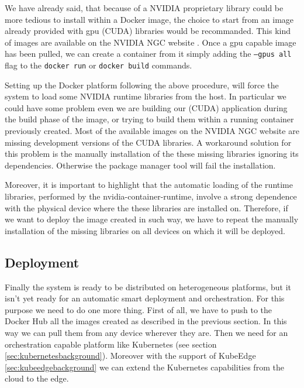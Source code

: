 We have already said, that because of a NVIDIA proprietary library could be more tedious to install within a Docker image, the choice to start from an image already provided with gpu (CUDA) libraries would be recommanded. This kind of images are available on the NVIDIA NGC website \cite{nvidiangc}. Once a gpu capable image has been pulled, we can create a container from it simply adding the \texttt{--gpus all} flag to the \texttt{docker run} or \texttt{docker build} commands.

Setting up the Docker platform following the above procedure, will force the system to load some NVIDIA runtime libraries from the host. 
In particular we could have some problem even we are building our (CUDA) application during the build phase of the image, or trying to build them within a running container previously created. 
Most of the available images on the NVIDIA NGC website are missing development versions of the CUDA libraries. A workaround solution for this problem is the manually installation of the these missing libraries ignoring its dependencies. Otherwise the package manager tool will fail the installation.

Moreover, it is important to highlight that the automatic loading of the runtime libraries, performed by the nvidia-container-runtime, involve a strong dependence with the physical device where the these libraries are installed on. Therefore, if we want to deploy the image created in such way, we have to repeat the manually installation of the missing libraries on all devices on which it will be deployed.



\subsection{Deployment}
Finally the system is ready to be distributed on heterogeneous platforms, but it isn't yet ready for an automatic smart deployment and orchestration.
For this purpose we need to do one more thing. First of all, we have to push to the Docker Hub all the images created as described in the previous section. In this way we can pull them from any device wherever they are. Then we need for an orchestration capable platform like Kubernetes (see section \ref{sec:kubernetesbackground}). Moreover with the support of KubeEdge \ref{sec:kubeedgebackground} we can extend the Kubernetes capabilities from the cloud to the edge.

